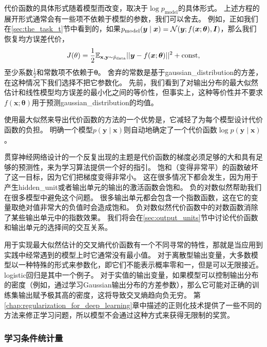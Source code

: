 代价函数的具体形式随着模型而改变，取决于$\log p_\text{model}$的具体形式。
上述方程的展开形式通常会有一些项不依赖于模型的参数，我们可以舍去。
例如，正如我们在\ref{sec:the_task_t}节中看到的，如果$p_\text{model}(\bm{y}\mid\bm{x}) = \mathcal{N}(\bm{y};f(\bm{x};\bm{\theta}), \bm{I})$，那么我们恢复均方误差代价，
\begin{equation}
J(\theta) = \frac{1}{2} \mathbb{E}_{\mathbf{x}, \mathbf{y} \sim  \hat{p}_\text{data}} || \bm{y} - f(\bm{x}; \bm{\theta}) ||^2 + \text{const},
\end{equation}
至少系数$\frac{1}{2}$和常数项不依赖于$\bm{\theta}$。
舍弃的常数是基于\gls{gaussian_distribution}的方差，在这种情况下我们选择不把它参数化。
先前，我们看到了对输出分布的最大似然估计和线性模型均方误差的最小化之间的等价性，但事实上，这种等价性并不要求$f(\bm{x}; \bm{\theta})$用于预测\gls{gaussian_distribution}的均值。

使用最大似然来导出代价函数的方法的一个优势是，它减轻了为每个模型设计代价函数的负担。
明确一个模型$p(\bm{y}\mid\bm{x})$则自动地确定了一个代价函数$\log p(\bm{y}\mid\bm{x})$。

贯穿神经网络设计的一个反复出现的主题是代价函数的梯度必须足够的大和具有足够的预测性，来为学习算法提供一个好的指引。
饱和（变得非常平）的函数破坏了这一目标，因为它们把梯度变得非常小。
这在很多情况下都会发生，因为用于产生\gls{hidden_unit}或者输出单元的输出的激活函数会饱和。
负的对数似然帮助我们在很多模型中避免这个问题。
很多输出单元都会包含一个指数函数，这在它的变量取绝对值非常大的负值时会造成饱和。
负对数似然代价函数中的对数函数消除了某些输出单元中的指数效果。
我们将会在\ref{sec:output_units}节中讨论代价函数和输出单元的选择间的交互关系。


用于实现最大似然估计的交叉熵代价函数有一个不同寻常的特性，那就是当应用到实践中经常遇到的模型上时它通常没有最小值。
对于离散型输出变量，大多数模型以一种特殊的形式来参数化，即它们不能表示概率零和一，但是可以无限接近。
logistic回归是其中一个例子。
对于实值的输出变量，如果模型可以控制输出分布的密度（例如，通过学习Gaussian输出分布的方差参数），那么它可能对正确的训练集输出赋予极其高的密度，这将导致交叉熵趋向负无穷。
第\ref{chap:regularization_for_deep_learning}章中描述的正则化技术提供了一些不同的方法来修正学习问题，所以模型不会通过这种方式来获得无限制的奖赏。

\subsubsection{学习条件统计量}
\label{sec:learning_conditional_statistics}

